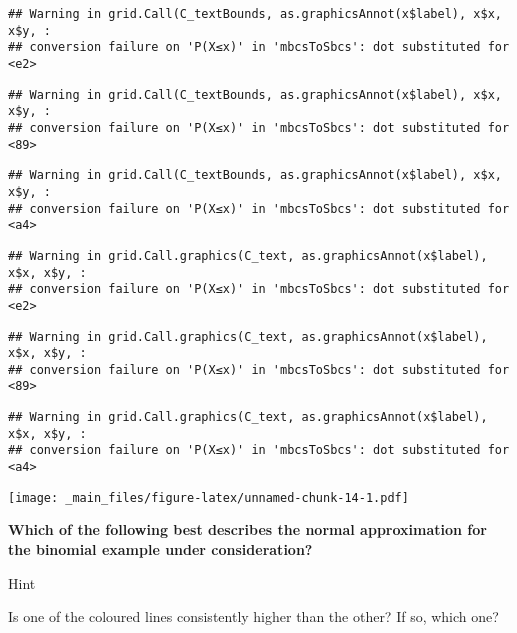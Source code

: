 \documentclass[
]{book}
\begin{document}
\begin{verbatim}
## Warning in grid.Call(C_textBounds, as.graphicsAnnot(x$label), x$x, x$y, :
## conversion failure on 'P(X≤x)' in 'mbcsToSbcs': dot substituted for <e2>
\end{verbatim}

\begin{verbatim}
## Warning in grid.Call(C_textBounds, as.graphicsAnnot(x$label), x$x, x$y, :
## conversion failure on 'P(X≤x)' in 'mbcsToSbcs': dot substituted for <89>
\end{verbatim}

\begin{verbatim}
## Warning in grid.Call(C_textBounds, as.graphicsAnnot(x$label), x$x, x$y, :
## conversion failure on 'P(X≤x)' in 'mbcsToSbcs': dot substituted for <a4>
\end{verbatim}

\begin{verbatim}
## Warning in grid.Call.graphics(C_text, as.graphicsAnnot(x$label), x$x, x$y, :
## conversion failure on 'P(X≤x)' in 'mbcsToSbcs': dot substituted for <e2>
\end{verbatim}

\begin{verbatim}
## Warning in grid.Call.graphics(C_text, as.graphicsAnnot(x$label), x$x, x$y, :
## conversion failure on 'P(X≤x)' in 'mbcsToSbcs': dot substituted for <89>
\end{verbatim}

\begin{verbatim}
## Warning in grid.Call.graphics(C_text, as.graphicsAnnot(x$label), x$x, x$y, :
## conversion failure on 'P(X≤x)' in 'mbcsToSbcs': dot substituted for <a4>
\end{verbatim}

\texttt{[image: \_main\_files/figure-latex/unnamed-chunk-14-1.pdf]}

\textbf{Which of the following best describes the normal approximation for the binomial example under consideration?}

Hint

Is one of the coloured lines consistently higher than the other? If so, which one?
\end{document}
